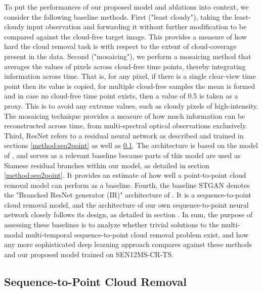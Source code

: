 \documentclass[journal]{IEEEtran}
\begin{document}
To put the performances of our proposed model and ablations into context, we consider the following baseline methods. First ("least cloudy"), taking the least-cloudy input observation and forwarding it without further modification to be compared against the cloud-free target image. This provides a measure of how hard the cloud removal task is with respect to the extent of cloud-coverage present in the data. Second ("mosaicing"), we perform a mosaicing method that averages the values of pixels across cloud-free time points, thereby integrating information across time. That is, for any pixel, if there is a single clear-view time point then its value is copied, for multiple cloud-free samples the mean is formed and in case no cloud-free time point exists, then a value of 0.5 is taken as a proxy. This is to avoid any extreme values, such as cloudy pixels of high-intensity. The mosaicing technique provides a measure of how much information can be reconstructed across time, from multi-spectral optical observations exclusively. Third, ResNet refers to a residual neural network as described and trained in sections \ref{method:seq2point} as well as \ref{exp:seq2point}. The architecture is based on the model of \cite{meraner2020cloud}, and serves as a relevant baseline because parts of this model are used as Siamese residual branches within our model, as detailed in section \ref{method:seq2point}. It provides an estimate of how well a point-to-point cloud removal model can perform as a baseline. Fourth, the baseline STGAN denotes the "Branched ResNet generator (IR)" architecture of \cite{Sarukkai_Jain_Uzkent_Ermon_2019}. It is a sequence-to-point cloud removal model, and the architecture of our own sequence-to-point neural network closely follows its design, as detailed in section \label{method:seq2point}.
In sum, the purpose of assessing these baselines is to analyze whether trivial solutions to the multi-modal multi-temporal sequence-to-point cloud removal problem exist, and how any more sophisticated deep learning approach compares against these methods and our proposed model trained on SEN12MS-CR-TS.

\subsection{Sequence-to-Point Cloud Removal} \label{exp:seq2point}
\end{document}
